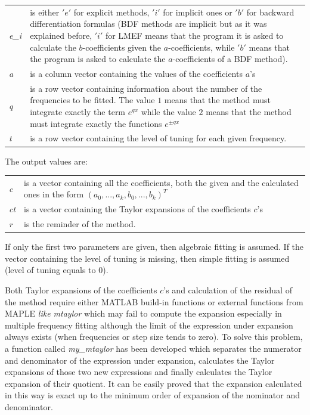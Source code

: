 \documentclass[acmtoms,acmnow]{acmtrans2m}
\begin{document}
\begin{xtabular}{p{0.1\textwidth}p{0.8\textwidth}}
{\it e\_i} & is either $'e'$ for explicit methods, $'i'$ for implicit ones or $'b'$ for backward differentiation formulas (BDF methods are implicit but as it was explained before, $'i'$ for LMEF means that the program it is asked to calculate the $b$-coefficients given the $a$-coefficients, while $'b'$ means that the program is asked to calculate the $a$-coefficients of a BDF method). 
\\
{\it a} & is a column vector containing the values of the coefficients $a$'s \\
{\it q} & is a row vector containing information about the number of the frequencies to be fitted. The value $1$ means that the method must integrate exactly the term $e^{qx}$ while the value $2$ means that the method must integrate exactly the functions $e^{\pm q x}$ \\
{\it t} & is a row vector containing the level of tuning for each given frequency.
\end{xtabular}

The output values are:

\begin{xtabular}{p{0.1\textwidth}p{0.8\textwidth}}
{\it c} & is a vector containing all the coefficients, both the given and the calculated ones in the form $(a_0,...,a_k,b_0,...,b_k)^T$
 \\
{\it ct} & is a vector containing the Taylor expansions of the coefficients $c$'s
\\
{\it r} & is the reminder of the method.
\end{xtabular}

If only the first two parameters are given, then algebraic fitting is assumed. If the vector containing the level of tuning is missing, then simple fitting is assumed (level of tuning equals to $0$).

Both Taylor expansions of the coefficients $c$'s and calculation of the residual of the method require either MATLAB build-in functions or external functions from MAPLE {\it like mtaylor} which may fail to compute the expansion especially in multiple frequency fitting although the limit of the expression under expansion always exists (when frequencies or step size tends to zero). To solve this problem, a function called {\it my\_mtaylor} has been developed which separates the numerator and denominator of the expression under expansion, calculates the Taylor expansions of those two new expressions and finally calculates the Taylor expansion of their quotient. It can be easily proved that the expansion calculated in this way is exact up to the minimum order of expansion of the nominator and denominator. 
\end{document}
